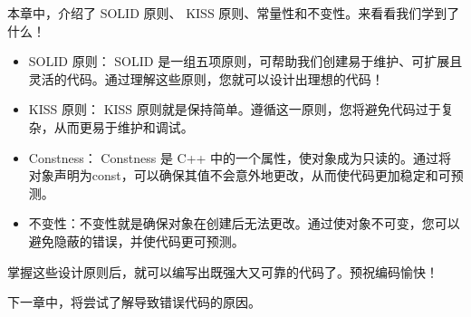 本章中，介绍了 SOLID 原则、 KISS 原则、常量性和不变性。来看看我们学到了什么！

\begin{itemize}
\item
SOLID 原则： SOLID 是一组五项原则，可帮助我们创建易于维护、可扩展且灵活的代码。通过理解这些原则，您就可以设计出理想的代码！

\item
KISS 原则： KISS 原则就是保持简单。遵循这一原则，您将避免代码过于复杂，从而更易于维护和调试。

\item
Constness： Constness 是 C++ 中的一个属性，使对象成为只读的。通过将对象声明为const，可以确保其值不会意外地更改，从而使代码更加稳定和可预测。

\item
不变性：不变性就是确保对象在创建后无法更改。通过使对象不可变，您可以避免隐蔽的错误，并使代码更可预测。
\end{itemize}

掌握这些设计原则后，就可以编写出既强大又可靠的代码了。预祝编码愉快！

下一章中，将尝试了解导致错误代码的原因。
